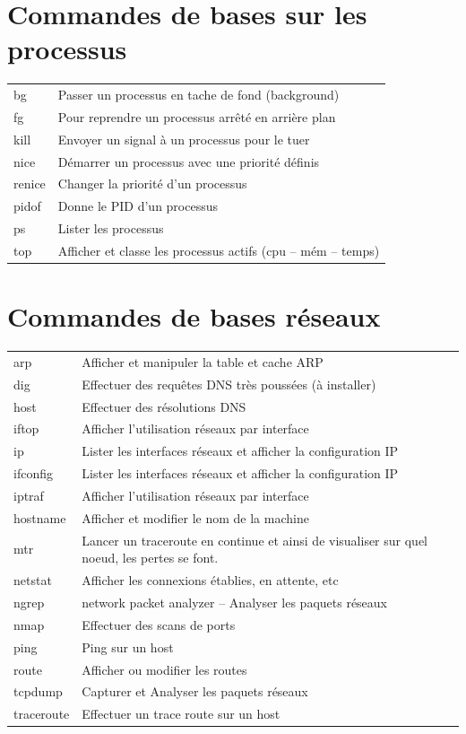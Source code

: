 \documentclass[a4paper, 11pt, french, oneside]{book}
\begin{document}
		\section{Commandes de bases sur les processus}
			\begin{tabular}{p{3cm}|p{11cm}}
		    	bg	& Passer un processus en tache de fond (background)\\
				fg	& Pour reprendre un processus arrêté en arrière plan\\
				kill	& Envoyer un signal à un processus pour le tuer\\
				nice	& Démarrer un processus avec une priorité définis\\
				renice	& Changer la priorité d’un processus\\
				pidof	& Donne le PID d’un processus\\
				ps	& Lister les processus\\
				top	& Afficher et classe les processus actifs (cpu – mém – temps)\\
		    \end{tabular}
		\section{Commandes de bases réseaux}
		    \begin{tabular}{p{3cm}|p{11cm}}
				arp	& Afficher et manipuler la table et cache ARP\\
				dig	& Effectuer des requêtes DNS très poussées (à installer)\\
				host	& Effectuer des résolutions DNS\\
				iftop	& Afficher l’utilisation réseaux par interface\\
				ip	& Lister les interfaces réseaux et afficher la configuration IP\\
				ifconfig	& Lister les interfaces réseaux et afficher la configuration IP\\
				iptraf	& Afficher l’utilisation réseaux par interface\\
				hostname	& Afficher et modifier le nom de la machine\\
				mtr	& Lancer un traceroute en continue et ainsi de visualiser sur quel noeud, les pertes se font.\\
				netstat	& Afficher les connexions établies, en attente, etc\\
				ngrep	& network packet analyzer – Analyser les paquets réseaux\\
				nmap	& Effectuer des scans de ports\\
				ping	& Ping sur un host\\
				route	& Afficher ou modifier les routes\\
				tcpdump	& Capturer et Analyser les paquets réseaux\\
				traceroute	& Effectuer un trace route sur un host\\
		    \end{tabular}
\end{document}
